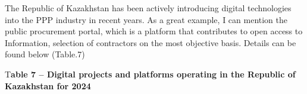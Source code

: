 The Republic of Kazakhstan has been actively introducing digital
technologies into the PPP industry in recent years. As a great example,
I can mention the public procurement portal, which is a platform that
contributes to open access to Information, selection of contractors on
the most objective basis. Details can be found below (Table.7)

T{\bfseries able 7 -- Digital projects and platforms operating in the
Republic of Kazakhstan for 2024}

